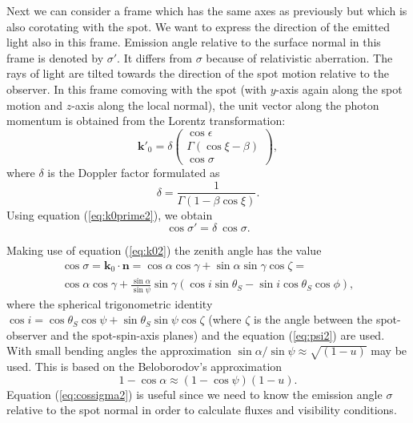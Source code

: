 \documentclass{wihuri}
\def\be{\begin{equation}}
\def\ee{\end{equation}}
\def\Dop{\delta}
\def\thetas{\theta_{S}}
\newcommand{\bmath}[1]{\boldsymbol{#1}}
\begin{document}

Next we can consider a frame which has the same axes as previously but which is also corotating with the spot. We want to express the direction of the emitted light also in this frame. Emission angle relative to the surface normal in this frame is denoted by
$\sigma'$.  It differs from $\sigma$ because of relativistic aberration. The rays of light are tilted towards the direction of the spot motion relative to the observer.
In this frame comoving with the spot 
(with $y$-axis again along the spot motion and $z$-axis along the local normal), 
the unit vector along the photon momentum  is 
obtained from the Lorentz transformation: 
\be \label{eq:k0prime2}
\bmath{k}'_{0} = \Dop
\left( \begin{array}{c}
\cos \epsilon \\
\Gamma (\cos\xi-\beta)\\ 
\cos\sigma
\end{array}
\right) ,
\ee 
where $\delta$ is the Doppler factor formulated as
\be \label{eq:dop2}
\Dop=\frac{1}{\Gamma(1-\beta\cos\xi)} .
\ee
Using equation (\ref{eq:k0prime2}), we obtain
\be \label{eq:aberr2}
\cos\sigma' =   \Dop \ \cos\sigma.
\ee
 
Making use of equation (\ref{eq:k02}) the zenith angle has the value
\be\label{eq:cossigma2}
\begin{split}
\cos\sigma = \bmath{k}_{0}\cdot\bmath{n} = \cos\alpha\cos\gamma+\sin\alpha\sin\gamma\cos\zeta = \\
\cos \alpha  \cos \gamma + \frac{\sin \alpha}{\sin \psi} \sin \gamma (\cos i \sin \thetas - \sin i \cos \thetas \cos \phi),
\end{split}
\ee
where the spherical trigonometric identity $\cos i = \cos\thetas\cos\psi+\sin\thetas\sin\psi\cos\zeta$ (where $\zeta$ is the angle between the spot-observer and the spot-spin-axis planes) and the equation (\ref{eq:psi2}) are used. With small bending angles the approximation $\sin \alpha / \sin \psi \approx \sqrt{(1-u)}$ may be used. This is based on the Beloborodov's approximation  \cite{beloborodov}
\be \label{eq:beloborodov}
1-\cos \alpha \approx (1 - \cos \psi)(1 - u).
\ee
Equation (\ref{eq:cossigma2}) is useful since we need to know the emission angle $\sigma$ relative to the spot normal in order to calculate fluxes and visibility conditions. 
\end{document}
